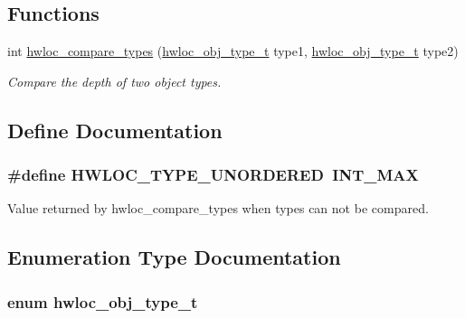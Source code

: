 \subsection*{Functions}
\begin{CompactItemize}
\item 
int \hyperlink{group__hwlocality__types_g1820ea0dfd8e9dca28f9ea7624df5ae2}{hwloc\_\-compare\_\-types} (\hyperlink{group__hwlocality__types_gcd37bb612667dc437d66bfb175a8dc55}{hwloc\_\-obj\_\-type\_\-t} type1, \hyperlink{group__hwlocality__types_gcd37bb612667dc437d66bfb175a8dc55}{hwloc\_\-obj\_\-type\_\-t} type2)
\begin{CompactList}\small\item\em Compare the depth of two object types. \item\end{CompactList}\end{CompactItemize}


\subsection{Define Documentation}
\hypertarget{group__hwlocality__types_g3b6e4128e9fe773863b123fa6e4a080b}{
\subsubsection[{HWLOC\_\-TYPE\_\-UNORDERED}]{\setlength{\rightskip}{0pt plus 5cm}\#define HWLOC\_\-TYPE\_\-UNORDERED~INT\_\-MAX}}
\label{group__hwlocality__types_g3b6e4128e9fe773863b123fa6e4a080b}


Value returned by hwloc\_\-compare\_\-types when types can not be compared. 



\subsection{Enumeration Type Documentation}
\hypertarget{group__hwlocality__types_gcd37bb612667dc437d66bfb175a8dc55}{
\subsubsection[{hwloc\_\-obj\_\-type\_\-t}]{\setlength{\rightskip}{0pt plus 5cm}enum {\bf hwloc\_\-obj\_\-type\_\-t}}}
\label{group__hwlocality__types_gcd37bb612667dc437d66bfb175a8dc55}


